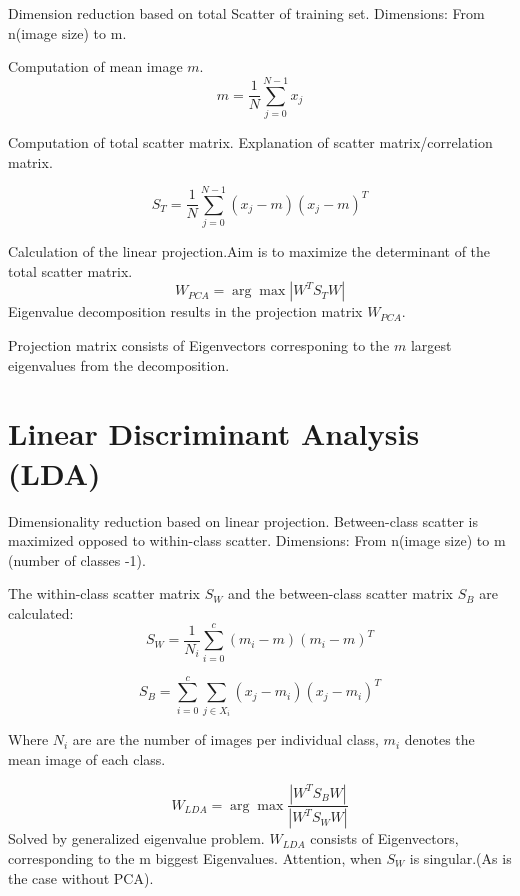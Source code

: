 Dimension reduction based on total Scatter of training set.
Dimensions: From n(image size) to m.


Computation of mean image $m$.
\begin{equation}
m=\frac{1}{N}\sum\limits_{j=0}^{N-1}{x_j}
\end{equation}

Computation of total scatter matrix.
Explanation of scatter matrix/correlation matrix.

\begin{equation}
S_T=\frac{1}{N}\sum\limits_{j=0}^{N-1}(x_j-m)(x_j-m)^T
\end{equation}

Calculation of the linear projection.Aim is to maximize the determinant
 of the total scatter matrix.
\begin{equation}
W_{PCA}=\arg \max |W^T S_T W |
\end{equation}
Eigenvalue decomposition results in the projection matrix $W_{PCA}$.

Projection matrix consists of Eigenvectors corresponing to the $m$
largest eigenvalues from the decomposition.


\section{Linear Discriminant Analysis (LDA)}
Dimensionality reduction based on linear projection.
Between-class scatter is maximized opposed to within-class scatter.
Dimensions: From n(image size) to m (number of classes -1).


The within-class scatter matrix $S_W$ and the between-class scatter matrix $S_B$ are calculated:
\begin{equation}
  S_W=\frac{1}{N_i}\sum\limits_{i=0}^{c}(m_i-m)(m_i-m)^T
\end{equation}

\begin{equation}
  S_B=\sum\limits_{i=0}^{c}\sum\limits_{j \in X_i}(x_j-m_i)(x_j-m_i)^T
\end{equation}

Where $N_i$ are are the number of images per individual class, $m_i$ denotes the mean image of
each class.


\begin{equation}
  W_{LDA}=\arg \max \frac{|W^T S_B W |}{|W^T S_W W|}
\end{equation}
Solved by generalized eigenvalue problem. $W_{LDA}$ consists of Eigenvectors, corresponding
to the m biggest Eigenvalues.
Attention, when  $S_W$ is singular.(As is the case without PCA).

